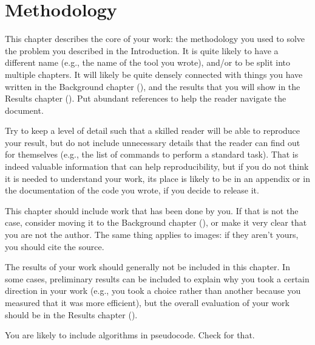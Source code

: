 \chapter{Methodology}\label{sec:method}

This chapter describes the core of your work: the methodology you used to solve the problem
you described in the Introduction. It is quite likely to have a different name (e.g., the
name of the tool you wrote), and/or to be split into multiple chapters. It will likely be quite
densely connected with things you have written in the Background chapter (),
and the results that you will show in the Results chapter (). Put abundant
references to help the reader navigate the document.

Try to keep a level of detail such that a skilled reader will be able to reproduce your result,
but do not include unnecessary details that the reader can find out for themselves (e.g., the
list of commands to perform a standard task). That is indeed valuable information that can help
reproducibility, but if you do not think it is needed to understand your work, its place is
likely to be in an appendix or in the documentation of the code you wrote, if you decide to
release it.

This chapter should include work that has been done by you. If that is not the case, consider
moving it to the Background chapter (), or make it very clear that you are
not the author. The same thing applies to images: if they aren't yours, you should cite the
source.

The results of your work should generally not be included in this chapter. In some cases,
preliminary results can be included to explain why you took a certain direction in your work
(e.g., you took a choice rather than another because you measured that it was more efficient),
but the overall evaluation of your work should be in the Results chapter ().

You are likely to include algorithms in pseudocode. Check
 for that.
